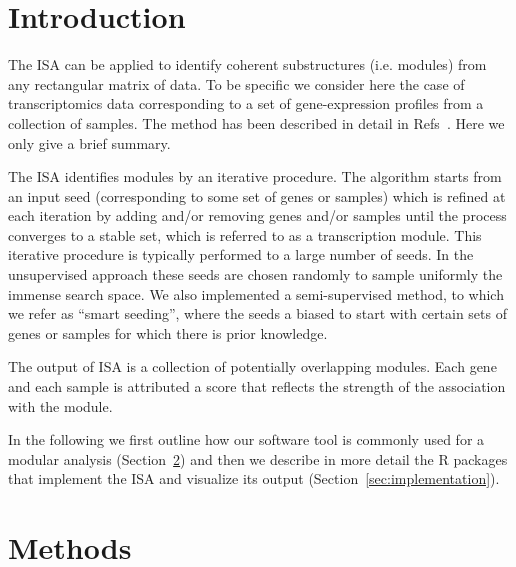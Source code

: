 \documentclass{bioinfo}
\begin{document}
\section{Introduction}

The ISA can be applied to identify coherent substructures (i.e. modules)
from any rectangular matrix of data. To be specific we consider here the
case of transcriptomics data corresponding to a set of gene-expression
profiles from a collection of samples. The method has been described in
detail in Refs~\citep{isamod,isa}. Here we only give a brief summary.

The ISA identifies modules by an iterative procedure. The algorithm starts
from an input seed (corresponding to some set of genes or samples) which is
refined at each iteration by adding and/or removing genes and/or samples
until the process converges to a stable set, which is referred to as a
transcription module. This iterative procedure is typically performed to a
large number of seeds. In the unsupervised approach these seeds are chosen
randomly to sample uniformly the immense search space. We also implemented a
semi-supervised method, to which we refer as ``smart seeding'', where the
seeds a biased to start with certain sets of genes or samples for which
there is prior knowledge.

The output of ISA is a collection of potentially overlapping modules. Each
gene and each sample is attributed a score that reflects the strength of the
association with the module.

In the following we first outline how our software tool is commonly used for a
modular analysis (Section~\ref{sec:methods}) and then we describe in more
detail the R packages that implement the ISA and visualize its output
(Section~\ref{sec:implementation}).

\section{Methods}%
\label{sec:methods}
\end{document}
